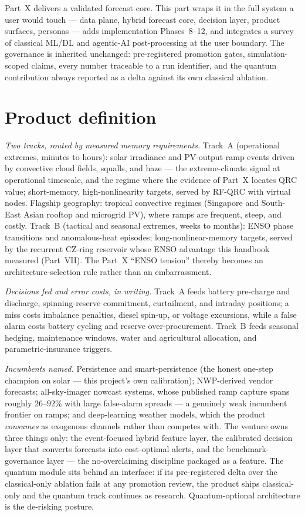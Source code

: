 
Part~X delivers a validated forecast core. This part wraps it in the full
system a user would touch --- data plane, hybrid forecast core, decision
layer, product surfaces, personas --- adds implementation Phases~8--12, and
integrates a survey of classical ML/DL and agentic-AI post-processing at the
user boundary. The governance is inherited unchanged: pre-registered
promotion gates, simulation-scoped claims, every number traceable to a run
identifier, and the quantum contribution always reported as a delta against
its own classical ablation.

\section{Product definition}
\label{sec:prod-def}

\emph{Two tracks, routed by measured memory requirements.} Track~A
(operational extremes, minutes to hours): solar irradiance and PV-output
ramp events driven by convective cloud fields, squalls, and haze --- the
extreme-climate signal at operational timescale, and the regime where the
evidence of Part~X locates QRC value; short-memory, high-nonlinearity
targets, served by RF-QRC with virtual nodes. Flagship geography: tropical
convective regimes (Singapore and South-East Asian rooftop and microgrid
PV), where ramps are frequent, steep, and costly. Track~B (tactical and
seasonal extremes, weeks to months): ENSO phase transitions and
anomalous-heat episodes; long-nonlinear-memory targets, served by the
recurrent CZ-ring reservoir whose ENSO advantage this handbook measured
(Part~VII). The Part~X ``ENSO tension'' thereby becomes an
architecture-selection rule rather than an embarrassment.

\emph{Decisions fed and error costs, in writing.} Track~A feeds battery
pre-charge and discharge, spinning-reserve commitment, curtailment, and
intraday positions; a miss costs imbalance penalties, diesel spin-up, or
voltage excursions, while a false alarm costs battery cycling and reserve
over-procurement. Track~B feeds seasonal hedging, maintenance windows,
water and agricultural allocation, and parametric-insurance triggers.

\emph{Incumbents named.} Persistence and smart-persistence (the honest
one-step champion on solar --- this project's own calibration); NWP-derived
vendor forecasts; all-sky-imager nowcast systems, whose published ramp
capture spans roughly $26$--$92\%$ with large false-alarm spreads --- a
genuinely weak incumbent frontier on ramps; and deep-learning weather
models, which the product \emph{consumes} as exogenous channels rather than
competes with. The venture owns three things only: the event-focused hybrid
feature layer, the calibrated decision layer that converts forecasts into
cost-optimal alerts, and the benchmark-governance layer --- the
no-overclaiming discipline packaged as a feature. The quantum module sits
behind an interface: if its pre-registered delta over the classical-only
ablation fails at any promotion review, the product ships classical-only
and the quantum track continues as research. Quantum-optional architecture
is the de-risking posture.

